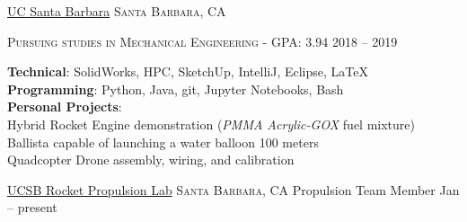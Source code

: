 \documentclass[12pt]{article}
\begin{document}
	\headedsection
	{\href{https://engineering.ucsb.edu/}{UC Santa Barbara}}
	{\textsc{Santa Barbara, CA}} {%
		\headedsubsection
		{\textsc{Pursuing studies in Mechanical Engineering - GPA:} 3.94}
		{2018 -- 2019}{}
		\vspace{-.2em}
		
		
		
	}
	
	\spacedhrule{-0.5em}{-0.5em}
	
	
	\textbf{Technical}: SolidWorks, HPC, SketchUp, IntelliJ, Eclipse, \LaTeX\\
	\textbf{Programming}: Python, Java, git, Jupyter Notebooks, Bash\\
	\textbf{Personal Projects}:\\
	\sbull Hybrid Rocket Engine demonstration (\textit{PMMA Acrylic-GOX} fuel mixture)\\
	\sbull Ballista capable of launching a water balloon 100 meters\\
	\sbull Quadcopter Drone assembly, wiring, and calibration\\
	
	
	\spacedhrule{-0.4em}{-0.6em}
	
	\headedsection  %
	{\href{http://www.rplatucsb.com/}{UCSB Rocket Propulsion Lab}}
	{\textsc{Santa Barbara, CA}} {
		\headedsubsection
		{Propulsion Team Member}
		{Jan  -- present}
		{}
	}
\end{document}
